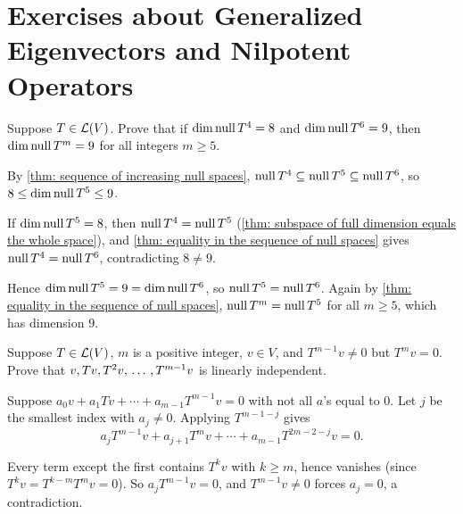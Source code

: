 \section*{Exercises about Generalized Eigenvectors and Nilpotent Operators}

\begin{xrcs}
  Suppose $T \in \mathcal{L}(V)$. Prove that if $\dim \operatorname{null} T^4 = 8$ and $\dim \operatorname{null} T^6 = 9$, then $\dim \operatorname{null} T^m = 9$ for all integers $m \geq 5$.

\begin{xprf}
  By \ref{thm: sequence of increasing null spaces}, $\operatorname{null} T^4 \subseteq \operatorname{null} T^5 \subseteq \operatorname{null} T^6$, so $8 \leq \dim \operatorname{null} T^5 \leq 9$.

  If $\dim \operatorname{null} T^5 = 8$, then $\operatorname{null} T^4 = \operatorname{null} T^5$ (\ref{thm: subspace of full dimension equals the whole space}), and \ref{thm: equality in the sequence of null spaces} gives $\operatorname{null} T^4 = \operatorname{null} T^6$, contradicting $8 \neq 9$.

  Hence $\dim \operatorname{null} T^5 = 9 = \dim \operatorname{null} T^6$, so $\operatorname{null} T^5 = \operatorname{null} T^6$. Again by \ref{thm: equality in the sequence of null spaces}, $\operatorname{null} T^m = \operatorname{null} T^5$ for all $m \geq 5$, which has dimension $9$.
\end{xprf}
\end{xrcs}

\begin{xrcs}
  Suppose $T \in \mathcal{L}(V)$, $m$ is a positive integer, $v \in V$, and $T^{m-1} v \neq 0$ but $T^m v = 0$. Prove that $v, Tv, T^2 v, {\, \ldots \,\,}, T^{m-1} v$ is linearly independent.

\begin{xprf}
  Suppose $a_0 v + a_1 Tv + \cdots + a_{m-1} T^{m-1} v = 0$ with not all $a$'s equal to $0$. Let $j$ be the smallest index with $a_j \neq 0$. Applying $T^{m-1-j}$ gives
  \begin{equation}
    a_j T^{m-1} v + a_{j+1} T^m v + \cdots + a_{m-1} T^{2m-2-j} v = 0.
  \end{equation}

  Every term except the first contains $T^k v$ with $k \geq m$, hence vanishes (since $T^k v = T^{k-m} T^m v = 0$). So $a_j T^{m-1} v = 0$, and $T^{m-1} v \neq 0$ forces $a_j = 0$, a contradiction.
\end{xprf}
\end{xrcs}

